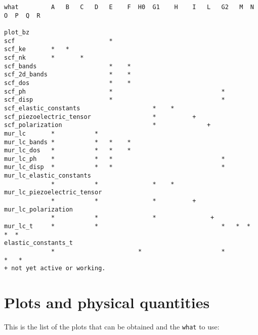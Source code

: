 \documentclass[12pt,a4paper]{article}
\begin{document}
\begin{verbatim}
what         A   B   C   D   E    F  H0  G1    H    I   L   G2   M  N  O  P  Q  R

plot_bz
scf                          *
scf_ke       *   *
scf_nk       *       *
scf_bands                    *    *
scf_2d_bands                 *    *
scf_dos                      *    *
scf_ph                       *                              *
scf_disp                     *                              *
scf_elastic_constants                    *    *
scf_piezoelectric_tensor                 *          +
scf_polarization                         *              +
mur_lc       *           *
mur_lc_bands *           *   *    *
mur_lc_dos   *           *   *    *
mur_lc_ph    *           *   *                              *
mur_lc_disp  *           *   *                              *
mur_lc_elastic_constants
             *           *               *    *
mur_lc_piezoelectric_tensor
             *           *               *          +
mur_lc_polarization
             *           *               *               +
mur_lc_t     *           *                                  *   *  *  *  *
elastic_constants_t
             *                       *                      *               *   *
+ not yet active or working.
\end{verbatim}


\newpage
\section{\color{coral}Plots and physical quantities}
This is the list of the plots that can be obtained and 
the \texttt{what} to use:
\end{document}
